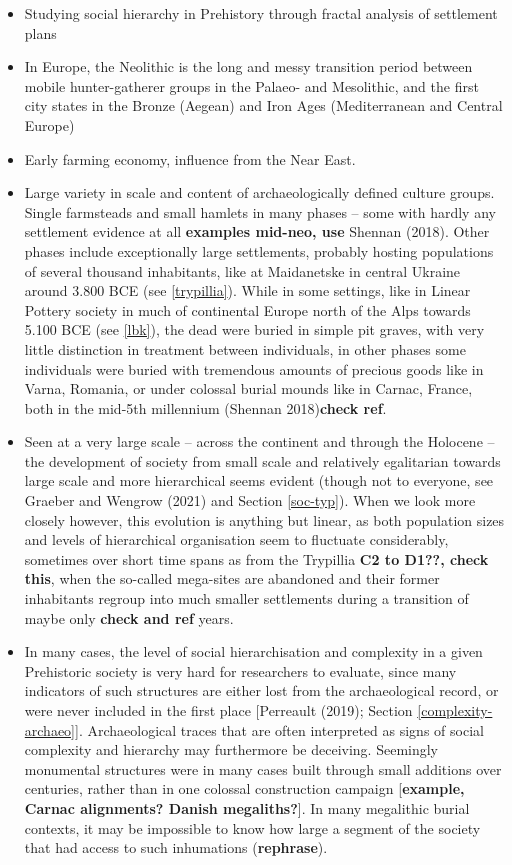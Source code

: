 \documentclass[
  12pt,
]{book}
\begin{document}
\begin{itemize}
\item
  Studying social hierarchy in Prehistory through fractal analysis of settlement plans
\item
  In Europe, the Neolithic is the long and messy transition period between mobile hunter-gatherer groups in the Palaeo- and Mesolithic, and the first city states in the Bronze (Aegean) and Iron Ages (Mediterranean and Central Europe)
\item
  Early farming economy, influence from the Near East.
\item
  Large variety in scale and content of archaeologically defined culture groups. Single farmsteads and small hamlets in many phases -- some with hardly any settlement evidence at all \textbf{examples mid-neo, use} Shennan (2018). Other phases include exceptionally large settlements, probably hosting populations of several thousand inhabitants, like at Maidanetske in central Ukraine around 3.800 BCE (see \ref{trypillia}). While in some settings, like in Linear Pottery society in much of continental Europe north of the Alps towards 5.100 BCE (see \ref{lbk}), the dead were buried in simple pit graves, with very little distinction in treatment between individuals, in other phases some individuals were buried with tremendous amounts of precious goods like in Varna, Romania, or under colossal burial mounds like in Carnac, France, both in the mid-5th millennium (Shennan 2018)\textbf{check ref}.
\item
  Seen at a very large scale -- across the continent and through the Holocene -- the development of society from small scale and relatively egalitarian towards large scale and more hierarchical seems evident (though not to everyone, see Graeber and Wengrow (2021) and Section \ref{soc-typ}). When we look more closely however, this evolution is anything but linear, as both population sizes and levels of hierarchical organisation seem to fluctuate considerably, sometimes over short time spans as from the Trypillia \textbf{C2 to D1??, check this}, when the so-called mega-sites are abandoned and their former inhabitants regroup into much smaller settlements during a transition of maybe only \textbf{check and ref} years.
\item
  In many cases, the level of social hierarchisation and complexity in a given Prehistoric society is very hard for researchers to evaluate, since many indicators of such structures are either lost from the archaeological record, or were never included in the first place {[}Perreault (2019); Section \ref{complexity-archaeo}{]}. Archaeological traces that are often interpreted as signs of social complexity and hierarchy may furthermore be deceiving. Seemingly monumental structures were in many cases built through small additions over centuries, rather than in one colossal construction campaign {[}\textbf{example, Carnac alignments? Danish megaliths?}{]}. In many megalithic burial contexts, it may be impossible to know how large a segment of the society that had access to such inhumations (\textbf{rephrase}).

\end{itemize}
\end{document}
